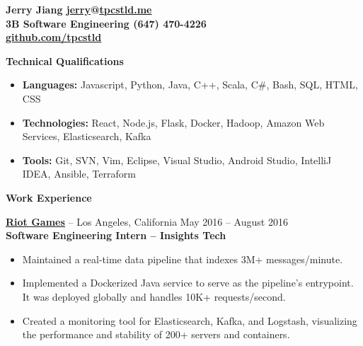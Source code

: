 \documentclass{letter}
\begin{document}
  \thispagestyle{empty}


{\bfseries
  {\Large Jerry Jiang} \hfill \href{mailto:jerry@tpcstld.me}{\uline{jerry}}@\href{http://tpcstld.me}{\uline{tpcstld.me}} \\
  3B Software Engineering \hfill (647) 470-4226 \\
\null \hfill \href{https://github.com/tpcstld}{\uline{github.com/tpcstld}}} \\
\null \hrulefill

{\bfseries \Large Technical Qualifications}
\vspace{-3mm}
\begin{itemize}
    \item {\bfseries Languages:}
        Javascript, Python, Java, C++, Scala, C\#, Bash, SQL, HTML, CSS
    \item {\bfseries Technologies:}
        React, Node.js, Flask, Docker, Hadoop, Amazon Web Services,
        Elasticsearch, Kafka
    \item {\bfseries Tools:}
        Git, SVN, Vim, Eclipse, Visual Studio, Android Studio, IntelliJ IDEA,
        Ansible, Terraform
\end{itemize}

{\bfseries \Large Work Experience}

\vspace{-1.5mm}
{\bfseries \href{http://riotgames.com}{\uline{Riot Games}}} -- Los Angeles,
California \hfill May 2016 -- August 2016\\
{\bfseries Software Engineering Intern -- Insights Tech}
\vspace{-3mm}
\begin{itemize}
    \item Maintained a real-time data pipeline that indexes 3M+ messages/minute.
    \item Implemented a Dockerized Java service to serve as the pipeline's
      entrypoint. It was deployed globally and handles 10K+ requests/second.
    \item Created a monitoring tool for Elasticsearch, Kafka, and Logstash,
      visualizing the performance and stability of 200+ servers and containers.
\end{itemize}
\end{document}

